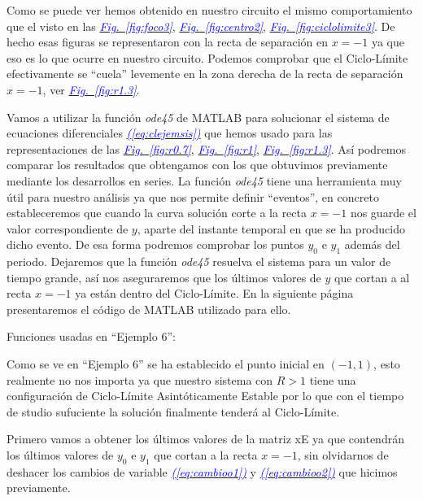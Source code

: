 \documentclass[12pt,a4paper]{report} %
\newcommand{\fref}[1]{\hyperref[#1]{\textcolor{blue}{\textit{Fig.~\ref*{#1}}}}}
\newcommand{\eref}[1]{\hyperref[#1]{\textcolor{blue}{\textit{(\ref*{#1})}}}}
\begin{document}
	Como se puede ver hemos obtenido en nuestro circuito el mismo comportamiento que el visto en las \fref{fig:foco3}, \fref{fig:centro2}, \fref{fig:ciclolimite3}. De hecho esas figuras se representaron con la recta de separación en $x=-1$ ya que eso es lo que ocurre en nuestro circuito. Podemos comprobar que el Ciclo-Límite efectivamente se ``cuela'' levemente en la zona derecha de la recta de separación $x=-1$, ver \fref{fig:r1.3}.
	
	\vspace{0.5cm} Vamos a utilizar la función \textit{ode45} de MATLAB para solucionar el sistema de ecuaciones diferenciales \eref{eq:clejemsis} que hemos usado para las representaciones de las \fref{fig:r0.7}, \fref{fig:r1}, \fref{fig:r1.3}. Así podremos comparar los resultados que obtengamos con los que obtuvimos previamente mediante los desarrollos en series. La función \textit{ode45} tiene una herramienta muy útil para nuestro análisis ya que nos permite definir ``eventos'', en concreto estableceremos que cuando la curva solución corte a la recta $x=-1$ nos guarde el valor correspondiente de $y$, aparte del instante temporal en que se ha producido dicho evento. De esa forma podremos comprobar los puntos $y_0$ e $y_1$ además del periodo. Dejaremos que la función \textit{ode45} resuelva el sistema para un valor de tiempo grande, así nos aseguraremos que los últimos valores de $y$ que cortan a al recta $x=-1$ ya están dentro del Ciclo-Límite. En la siguiente página presentaremos el código de MATLAB utilizado para ello.
	
	\newpage
	
	
	
	\vspace{0.5cm}\noindent Funciones usadas en ``Ejemplo 6'':
	\vspace{0.5cm}
	\vspace{0.5cm}
	
	\newpage
	
	Como se ve en ``Ejemplo 6'' se ha establecido el punto inicial en $(-1,1)$, esto realmente no nos importa ya que nuestro sistema con $R>1$ tiene una configuración de Ciclo-Límite Asintóticamente Estable por lo que con el tiempo de studio sufuciente la solución finalmente tenderá al Ciclo-Límite. 
	
	\vspace{0.5cm}\noindent Primero vamos a obtener los últimos valores de la matriz xE ya que contendrán los últimos valores de $y_0$ e $y_1$ que cortan a la recta $x=-1$, sin olvidarnos de deshacer los cambios de variable \eref{eq:cambioo1} y \eref{eq:cambioo2} que hicimos previamente.
	
\end{document}

